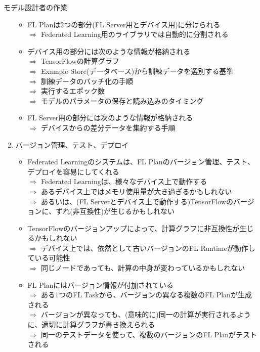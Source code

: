\documentclass[dvipdfmx,notheorems,t]{beamer}
\begin{document}
\begin{frame}{モデル設計者の作業}
\begin{enumerate}
\begin{itemize}
		\item FL Planは2つの部分(FL Server用とデバイス用)に分けられる \\
		$\Rightarrow$ Federated Learning用のライブラリでは自動的に分割される
		\newline
		
		\item デバイス用の部分には次のような情報が格納される \\
		$\Rightarrow$ TensorFlowの計算グラフ \\
		$\Rightarrow$ Example Store(データベース)から訓練データを選別する基準 \\
		$\Rightarrow$ 訓練データのバッチ化の手順 \\
		$\Rightarrow$ 実行するエポック数 \\
		$\Rightarrow$ モデルのパラメータの保存と読み込みのタイミング
		\newline
		
		\item FL Server用の部分には次のような情報が格納される \\
		$\Rightarrow$ デバイスからの差分データを集約する手順
	\end{itemize}
	
	\framebreak
	
	\item バージョン管理、テスト、デプロイ
	\begin{itemize}
		\item Federated Learningのシステムは、FL Planのバージョン管理、テスト、デプロイを容易にしてくれる \\
		$\Rightarrow$ Federated Learningは、様々なデバイス上で動作する \\
		$\Rightarrow$ あるデバイス上ではメモリ使用量が大き過ぎるかもしれない \\
		$\Rightarrow$ あるいは、(FL Serverとデバイス上で動作する)TensorFlowのバージョンに、ずれ(非互換性)が生じるかもしれない
		\newline
		
		\item TensorFlowのバージョンアップによって、計算グラフに非互換性が生じるかもしれない \\
		$\Rightarrow$ デバイス上では、依然として古いバージョンのFL Runtimeが動作している可能性 \\
		$\Rightarrow$ 同じノードであっても、計算の中身が変わっているかもしれない
		\newline
		
		\item FL Planにはバージョン情報が付加されている \\
		$\Rightarrow$ ある1つのFL Taskから、バージョンの異なる複数のFL Planが生成される \\
		$\Rightarrow$ バージョンが異なっても、(意味的に)同一の計算が実行されるように、適切に計算グラフが書き換えられる \\
		$\Rightarrow$ 同一のテストデータを使って、複数のバージョンのFL Planがテストされる
		\newline
		

\end{itemize}
\end{enumerate}
\end{frame}
\end{document}

